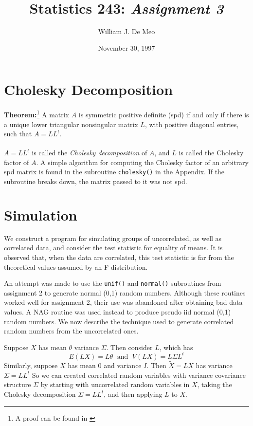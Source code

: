 \documentclass{article}
\begin{document}
\title{Statistics 243: \emph{Assignment 3}}
\author{William J. De Meo}
\date{November 30, 1997}
\maketitle
\section{Cholesky Decomposition}
{\bf Theorem:}\footnote{A proof can be found in \cite{Demmel}}  
A matrix $A$ is symmetric positive definite (spd) if
and only if there is a unique lower triangular nonsingular matrix $L$,
with positive diagonal entries, such that $A = LL^t$.  \\\\
$A = LL^t$ is called the \emph{Cholesky decomposition} of $A$, and $L$
is called the Cholesky factor of $A$.  A simple algorithm for
computing the Cholesky factor of an arbitrary spd matrix is found in
the subroutine {\tt cholesky()} in the Appendix.  If the subroutine
breaks down, the matrix passed to it was not spd.

\section{Simulation}
We construct a program for simulating groups of uncorrelated, as well
as correlated data, and consider the test statistic for equality
of means.  It is observed that, when the data are correlated, this
test statistic is far from the theoretical values assumed by an
F-distribution.

An attempt was made to use the {\tt unif()} and {\tt normal()}
subroutines from assignment 2 to generate normal (0,1) random numbers.
Although these routines worked well for assignment 2, their use was
abandoned after obtaining bad data values.  A NAG routine was used
instead to produce pseudo iid normal (0,1) random numbers.  We now
describe the technique used to generate correlated random numbers from
the uncorrelated ones.

Suppose $X$ has mean $\theta$ variance $\Sigma$.  Then consider $L$, which has
\[ E(LX) = L\theta \;\mbox{ and }\; V(LX) = L \Sigma L^t \]
Similarly, suppose $X$ has mean 0 and variance $I$.  Then $\tilde X = LX$ has 
variance $\Sigma = LL^t$
So we can created correlated random variables with variance covariance
structure $\Sigma$ by starting with uncorrelated random variables in $X$, 
taking the Cholesky decomposition $\Sigma = LL^t$, and then applying $L$ 
to $X$.
\end{document}
